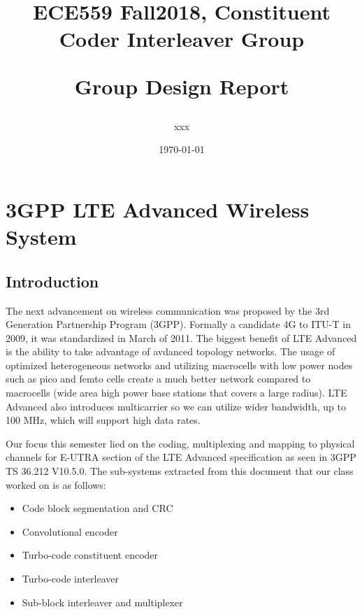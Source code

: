 \documentclass[letterpaper]{article} %
\begin{document}
\title{ECE559 Fall2018, Constituent Coder Interleaver Group\\
\begin{large}Group Design Report\end{large}}
\author{xxx}
\date{\today}%
\maketitle
\vspace{12.0cm}


\newpage 
\section{3GPP LTE Advanced Wireless System}
    \subsection{Introduction}
        The next advancement on wireless communication was proposed by the 3rd Generation Partnership Program (3GPP). Formally a candidate 4G to ITU-T in 2009, it was standardized in March of 2011.
        The biggest benefit of LTE Advanced is the ability to take advantage of avdanced topology networks. The usage of optimized heterogeneous networks and utilizing macrocells with low power nodes such as pico and femto cells create a much better network compared to macrocells (wide area high power base stations that covers a large radius). LTE Advanced also introduces multicarrier so we can utilize wider bandwidth, up to 100 MHz, which will support high data rates.
        
        Our focus this semester lied on the coding, multiplexing and mapping to physical channels for E-UTRA section of the LTE Advanced specification as seen in 3GPP TS 36.212 V10.5.0. The sub-systems extracted from this document that our class worked on is as follows:
        \begin{itemize}
            \item Code block segmentation and CRC
            \item Convolutional encoder
            \item Turbo-code constituent encoder
            \item Turbo-code interleaver
            \item Sub-block interleaver and multiplexer 
        \end{itemize}
\end{document}
